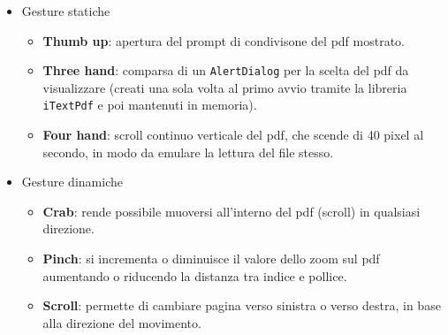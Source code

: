 \begin{itemize}
    \item Gesture statiche \begin{itemize}
        \item \textbf{Thumb up}: apertura del prompt di condivisone del pdf mostrato.
        \item \textbf{Three hand}: comparsa di un \texttt{AlertDialog} per la scelta del pdf da visualizzare (creati una sola volta al primo avvio tramite la libreria \texttt{iTextPdf} e poi mantenuti in memoria).
        \item \textbf{Four hand}: scroll continuo verticale del pdf, che scende di 40 pixel al secondo, in modo da emulare la lettura del file stesso.
    \end{itemize}
    \item Gesture dinamiche \begin{itemize}
        \item \textbf{Crab}: rende possibile muoversi all'interno del pdf (scroll) in qualsiasi direzione.
        \item \textbf{Pinch}: si incrementa o diminuisce il valore dello zoom sul pdf aumentando o riducendo la distanza tra indice e pollice.
        \item \textbf{Scroll}: permette di cambiare pagina verso sinistra o verso destra, in base alla direzione del movimento.
    \end{itemize}
    
\end{itemize}

